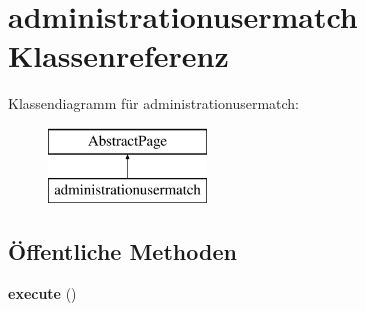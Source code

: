 \hypertarget{classadministrationusermatch}{}\section{administrationusermatch Klassenreferenz}
\label{classadministrationusermatch}
Klassendiagramm für administrationusermatch\+:\begin{figure}[H]
\begin{center}
\leavevmode
\includegraphics[height=2.000000cm]{classadministrationusermatch}
\end{center}
\end{figure}
\subsection*{Öffentliche Methoden}
\begin{DoxyCompactItemize}
\item 
\mbox{\label{classadministrationusermatch_a0280289c1be9d879db7469d26749561e}} 
{\bfseries execute} ()
\end{DoxyCompactItemize}
